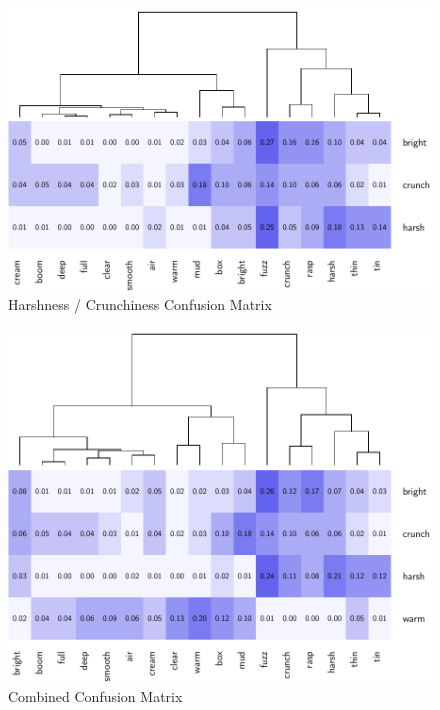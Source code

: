 		\begin{figure}[h!]
			\centering
			\includegraphics{chapter7/Images/CrunchConfusion.pdf}
			\caption{Harshness / Crunchiness Confusion Matrix}
		\end{figure}

		\begin{figure}[h!]
			\centering
			\includegraphics{chapter7/Images/CombinedConfusion.pdf}
			\caption{Combined Confusion Matrix}
		\end{figure}

